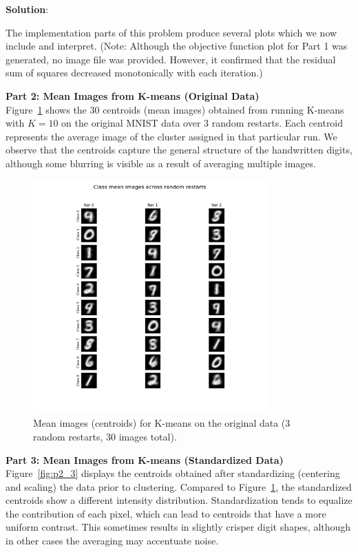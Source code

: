 \documentclass[submit]{../harvardml}
\newenvironment{solution}{
    \vspace{2mm}
    \color{blue}\noindent\textbf{Solution}:
}{}
\begin{document}
\begin{solution}
The implementation parts of this problem produce several plots which we now include and interpret. (Note: Although the objective function plot for Part 1 was generated, no image file was provided. However, it confirmed that the residual sum of squares decreased monotonically with each iteration.)

\medskip
\textbf{Part 2: Mean Images from K-means (Original Data)}\\
Figure~\ref{fig:p2_2} shows the 30 centroids (mean images) obtained from running K-means with $K=10$ on the original MNIST data over 3 random restarts. Each centroid represents the average image of the cluster assigned in that particular run. We observe that the centroids capture the general structure of the handwritten digits, although some blurring is visible as a result of averaging multiple images.

\begin{figure}[h!]
  \centering
  \includegraphics[width=0.8\textwidth]{img_output/p2.2.png}
  \caption{Mean images (centroids) for K-means on the original data (3 random restarts, 30 images total).}
  \label{fig:p2_2}
\end{figure}

\medskip
\textbf{Part 3: Mean Images from K-means (Standardized Data)}\\
Figure~\ref{fig:p2_3} displays the centroids obtained after standardizing (centering and scaling) the data prior to clustering. Compared to Figure~\ref{fig:p2_2}, the standardized centroids show a different intensity distribution. Standardization tends to equalize the contribution of each pixel, which can lead to centroids that have a more uniform contrast. This sometimes results in slightly crisper digit shapes, although in other cases the averaging may accentuate noise.


\end{solution}
\end{document}
